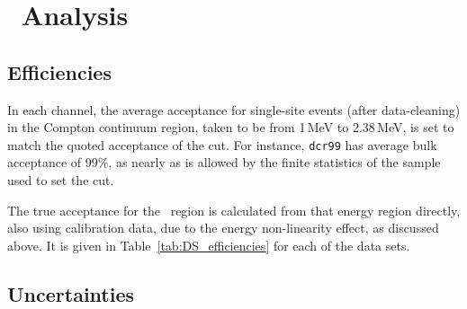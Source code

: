 %

\section{\MJ\ Analysis}
\subsection{Efficiencies}
In each channel, the average acceptance for single-site events (after data-cleaning) in the Compton continuum region, taken to be from 1\,MeV to 2.38\,MeV, is set to match the quoted acceptance of the cut. For instance, {\tt dcr99} has average bulk acceptance of 99\%, as nearly as is allowed by the finite statistics of the sample used to set the cut. 

The true acceptance for the \nonubb\ region is calculated from that energy region directly, also using calibration data, due to the energy non-linearity effect, as discussed above. It is given in Table~\ref{tab:DS_efficiencies} for each of the data sets.  

\subsection{Uncertainties}

